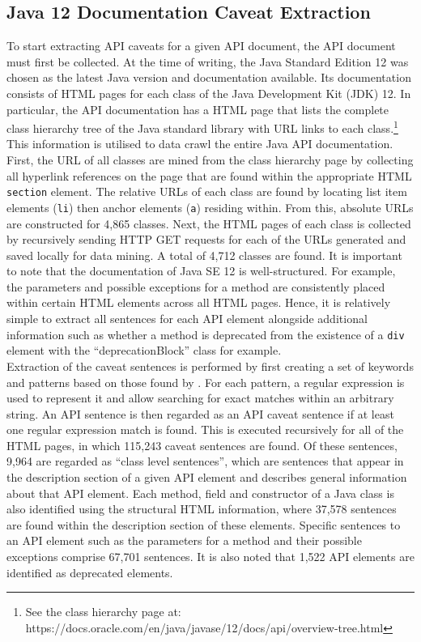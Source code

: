 \subsection{Java 12 Documentation Caveat Extraction}
\label{subsec:info-caveat-extract}
To start extracting API caveats for a given API document, the API document must first be collected. At the time of writing, the Java Standard Edition 12 was chosen as the latest Java version and documentation available. Its documentation consists of HTML pages for each class of the Java Development Kit (JDK) 12. In particular, the API documentation has a HTML page that lists the complete class hierarchy tree of the Java standard library with URL links to each class.\footnote{See the class hierarchy page at: https://docs.oracle.com/en/java/javase/12/docs/api/overview-tree.html} This information is utilised to data crawl the entire Java API documentation. First, the URL of all classes are mined from the class hierarchy page by collecting all hyperlink references on the page that are found within the appropriate HTML \lstinline{section} element. The relative URLs of each class are found by locating list item elements (\lstinline{li}) then anchor elements (\lstinline{a}) residing within. From this, absolute URLs are constructed for 4,865 classes. Next, the HTML pages of each class is collected by recursively sending HTTP GET requests for each of the URLs generated and saved locally for data mining. A total of 4,712 classes are found. It is important to note that the documentation of Java SE 12 is well-structured. For example, the parameters and possible exceptions for a method are consistently placed within certain HTML elements across all HTML pages. Hence, it is relatively simple to extract all sentences for each API element alongside additional information such as whether a method is deprecated from the existence of a \lstinline{div} element with the ``deprecationBlock'' class for example.\\

Extraction of the caveat sentences is performed by first creating a set of keywords and patterns based on those found by \cite{caveat-knowledge-graph}. For each pattern, a regular expression is used to represent it and allow searching for exact matches within an arbitrary string. An API sentence is then regarded as an API caveat sentence if at least one regular expression match is found. This is executed recursively for all of the HTML pages, in which 115,243 caveat sentences are found. Of these sentences, 9,964 are regarded as ``class level sentences'', which are sentences that appear in the description section of a given API element and describes general information about that API element. Each method, field and constructor of a Java class is also identified using the structural HTML information, where 37,578 sentences are found within the description section of these elements. Specific sentences to an API element such as the parameters for a method and their possible exceptions comprise 67,701 sentences. It is also noted that 1,522 API elements are identified as deprecated elements. \\

